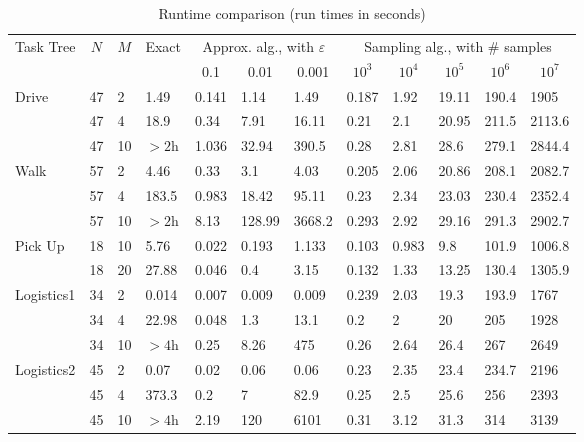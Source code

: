 \documentclass{article}
\begin{document}
\begin{table}[htb!]
	{\footnotesize
		\begin{tabular}{|l|l|l|l||l|l|l||l|l|l|l|l|}
			\hline
			\multicolumn{1}{|c|}{\multirow{2}{*}{Task Tree}} & \multicolumn{1}{c|}{\multirow{2}{*}{$N$}} & \multicolumn{1}{c|}{\multirow{2}{*}{$M$}} & \multirow{2}{*}{Exact} & \multicolumn{3}{c|}{Approx. alg., with $\varepsilon$} & \multicolumn{5}{c|}{Sampling alg., with \# samples} \\ \cline{5-12} 
			\multicolumn{1}{|c|}{} & \multicolumn{1}{c|}{} & \multicolumn{1}{c|}{} &  & \multicolumn{1}{c|}{0.1} & \multicolumn{1}{c|}{0.01} & \multicolumn{1}{c|}{0.001} & \multicolumn{1}{c|}{$10^{3}$} & \multicolumn{1}{c|}{$10^{4}$} & \multicolumn{1}{c|}{$10^{5}$} & \multicolumn{1}{c|}{$10^{6}$} & \multicolumn{1}{c|}{$10^{7}$} \\ \hline \hline
			\multirow{2}{*}{Drive} & 47 & 2 & 1.49 & 0.141 & 1.14 & 1.49 & 0.187 & 1.92 & 19.11 & 190.4 & 1905 \\ \cline{2-12} 
			& 47 & 4 & 18.9 & 0.34 & 7.91 & 16.11 & 0.21 & 2.1 & 20.95 &  211.5 & 2113.6\\ \cline{2-12}
			& 47 & 10 & $> 2$h & 1.036 & 32.94 & 390.5 & 0.28 & 2.81 & 28.6 &279.1  &  2844.4  \\ \hline
			\multirow{2}{*}{Walk}  & 57 & 2& 4.46 & 0.33 & 3.1 & 4.03 & 0.205 & 2.06 & 20.86 & 208.1 & 2082.7  \\ \cline{2-12} 
			& 57 & 4  & 183.5 & 0.983 & 18.42 & 95.11 & 0.23 & 2.34 & 23.03 & 230.4 & 2352.4 \\ \cline{2-12} 
			& 57 & 10 & $> 2$h & 8.13 & 128.99 & 3668.2 & 0.293 & 2.92 & 29.16 & 291.3 & 2902.7 \\ \hline
			\multirow{2}{*}{Pick Up} & 18 & 10 & 5.76 & 0.022 & 0.193 & 1.133 & 0.103 & 0.983 & 9.8 & 101.9 & 1006.8 \\ \cline{2-12} 
			& 18 & 20 & 27.88 & 0.046 & 0.4 & 3.15 & 0.132 & 1.33 & 13.25 & 130.4 & 1305.9 \\ \hline
			\multirow{2}{*}{Logistics1} & 34 & 2 & 0.014 & 0.007 &  0.009 & 0.009 & 0.239 & 2.03 & 19.3 & 193.9 & 1767 \\ \cline{2-12} 
			& 34 & 4 & 22.98 & 0.048 & 1.3 & 13.1 & 0.2 &  2 & 20 & 205 &1928\\ \cline{2-12}  
			& 34 & 10 & $> 4$h & 0.25 & 8.26 & 475 & 0.26 & 2.64 & 26.4 & 267 & 2649 \\ \hline 
			\multirow{2}{*}{Logistics2} & 45 & 2 & 0.07 &  0.02 &  0.06 & 0.06 & 0.23 & 2.35 & 23.4 & 234.7 & 2196 \\ \cline{2-12} 
			& 45 & 4 & 373.3& 0.2 & 7 & 82.9 & 0.25 & 2.5 & 25.6 & 256 & 2393\\ \cline{2-12}  
			& 45 & 10 & $> 4$h & 2.19 & 120 & 6101 & 0.31 & 3.12 & 31.3 &314 & 3139\\ \hline
		\end{tabular}
		\caption{Runtime comparison (run times in seconds)}
		\label{tab:runtimes1}
	}
	
\end{table}
\end{document}
